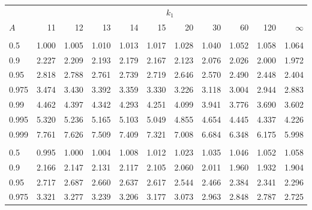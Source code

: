 \documentclass[
]{article}
\begin{document}
\begin{table}[H]
\centering
\begin{tabular}{lrrrrrrrrrr}
\toprule
\multicolumn{1}{c}{ } & \multicolumn{10}{c}{$k_1$} \\
\cmidrule(l{3pt}r{3pt}){2-11}
\hspace{1.1em}$A$ & 11 & 12 & 13 & 14 & 15 & 20 & 30 & 60 & 120 & $\infty$\\
\midrule
\addlinespace[0.3em]
\multicolumn{11}{l}{\textbf{$k_2=11$}}\\
\hspace{1em}0.5 & 1.000 & 1.005 & 1.010 & 1.013 & 1.017 & 1.028 & 1.040 & 1.052 & 1.058 & 1.064\\
\hspace{1em}0.9 & 2.227 & 2.209 & 2.193 & 2.179 & 2.167 & 2.123 & 2.076 & 2.026 & 2.000 & 1.972\\
\hspace{1em}0.95 & 2.818 & 2.788 & 2.761 & 2.739 & 2.719 & 2.646 & 2.570 & 2.490 & 2.448 & 2.404\\
\hspace{1em}0.975 & 3.474 & 3.430 & 3.392 & 3.359 & 3.330 & 3.226 & 3.118 & 3.004 & 2.944 & 2.883\\
\hspace{1em}0.99 & 4.462 & 4.397 & 4.342 & 4.293 & 4.251 & 4.099 & 3.941 & 3.776 & 3.690 & 3.602\\
\hspace{1em}0.995 & 5.320 & 5.236 & 5.165 & 5.103 & 5.049 & 4.855 & 4.654 & 4.445 & 4.337 & 4.226\\
\hspace{1em}0.999 & 7.761 & 7.626 & 7.509 & 7.409 & 7.321 & 7.008 & 6.684 & 6.348 & 6.175 & 5.998\\
\addlinespace[0.3em]
\multicolumn{11}{l}{\textbf{$k_2=12$}}\\
\hspace{1em}0.5 & 0.995 & 1.000 & 1.004 & 1.008 & 1.012 & 1.023 & 1.035 & 1.046 & 1.052 & 1.058\\
\hspace{1em}0.9 & 2.166 & 2.147 & 2.131 & 2.117 & 2.105 & 2.060 & 2.011 & 1.960 & 1.932 & 1.904\\
\hspace{1em}0.95 & 2.717 & 2.687 & 2.660 & 2.637 & 2.617 & 2.544 & 2.466 & 2.384 & 2.341 & 2.296\\
\hspace{1em}0.975 & 3.321 & 3.277 & 3.239 & 3.206 & 3.177 & 3.073 & 2.963 & 2.848 & 2.787 & 2.725\\

\end{tabular}
\end{table}
\end{document}
